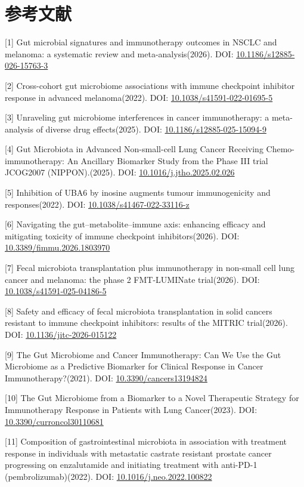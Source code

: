 \documentclass[11pt]{article}
\begin{document}
\section{参考文献}\label{ux53c2ux8003ux6587ux732e}

{[}1{]} Gut microbial signatures and immunotherapy outcomes in NSCLC and melanoma: a systematic review and meta-analysis(2026). DOI: \url{10.1186/s12885-026-15763-3}

{[}2{]} Cross-cohort gut microbiome associations with immune checkpoint inhibitor response in advanced melanoma(2022). DOI: \url{10.1038/s41591-022-01695-5}

{[}3{]} Unraveling gut microbiome interferences in cancer immunotherapy: a meta-analysis of diverse drug effects(2025). DOI: \url{10.1186/s12885-025-15094-9}

{[}4{]} Gut Microbiota in Advanced Non-small-cell Lung Cancer Receiving Chemo-immunotherapy: An Ancillary Biomarker Study from the Phase III trial JCOG2007 (NIPPON).(2025). DOI: \url{10.1016/j.jtho.2025.02.026}

{[}5{]} Inhibition of UBA6 by inosine augments tumour immunogenicity and responses(2022). DOI: \url{10.1038/s41467-022-33116-z}

{[}6{]} Navigating the gut--metabolite--immune axis: enhancing efficacy and mitigating toxicity of immune checkpoint inhibitors(2026). DOI: \url{10.3389/fimmu.2026.1803970}

{[}7{]} Fecal microbiota transplantation plus immunotherapy in non-small cell lung cancer and melanoma: the phase 2 FMT-LUMINate trial(2026). DOI: \url{10.1038/s41591-025-04186-5}

{[}8{]} Safety and efficacy of fecal microbiota transplantation in solid cancers resistant to immune checkpoint inhibitors: results of the MITRIC trial(2026). DOI: \url{10.1136/jitc-2026-015122}

{[}9{]} The Gut Microbiome and Cancer Immunotherapy: Can We Use the Gut Microbiome as a Predictive Biomarker for Clinical Response in Cancer Immunotherapy?(2021). DOI: \url{10.3390/cancers13194824}

{[}10{]} The Gut Microbiome from a Biomarker to a Novel Therapeutic Strategy for Immunotherapy Response in Patients with Lung Cancer(2023). DOI: \url{10.3390/curroncol30110681}

{[}11{]} Composition of gastrointestinal microbiota in association with treatment response in individuals with metastatic castrate resistant prostate cancer progressing on enzalutamide and initiating treatment with anti-PD-1 (pembrolizumab)(2022). DOI: \url{10.1016/j.neo.2022.100822}
\end{document}
